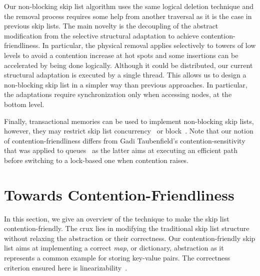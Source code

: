 Our non-blocking skip list algorithm uses the same logical deletion technique and the removal
process requires some help from another traversal as it is the case in previous skip lists. 
The main novelty is the decoupling of the abstract 
modification from the selective structural adaptation to achieve contention-friendliness. In particular, 
the physical removal 
applies selectively to towers of low levels to avoid a contention increase at hot spots 
and some insertions can be accelerated by being done logically.
Although it could be distributed, our current structural adaptation is 
executed by a single thread. This allows us to design a non-blocking skip list in a 
simpler way than previous approaches. In particular, the adaptations require synchronization
only when accessing nodes, at the bottom level.


Finally, transactional memories can be used to implement
non-blocking skip lists, however, they may restrict skip list concurrency~\cite{Fra03} or block~\cite{FGG09}.
Note that our notion of contention-friendliness differs from Gadi Taubenfield's 
contention-sensitivity that was applied to queues~\cite{Tau09} %
as the latter 
aims at executing an efficient path before switching to a lock-based one when contention raises.

%


\section{Towards Contention-Friendliness}\label{sec:cf}

In this section, we give an overview of the technique to make the skip list contention-friendly.
The crux lies in modifying the traditional skip list structure without 
relaxing the abstraction or their correctness.
Our contention-friendly skip list aims at implementing a correct \emph{map}, or dictionary, abstraction
as it represents a common example for storing key-value pairs. 
The correctness criterion ensured here is linearizability~\cite{HW90}.  


